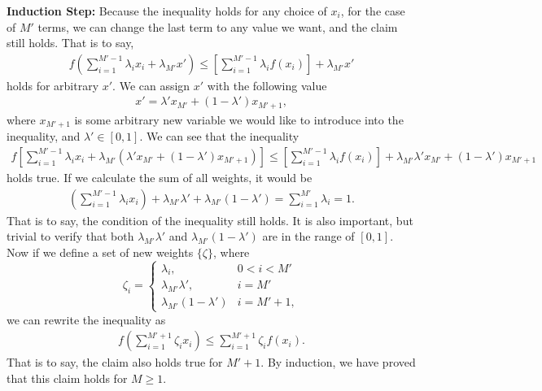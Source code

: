 \begin{answer}{}
	\noindent\textbf{Induction Step:}
	Because the inequality holds for any choice of $x_i$, for the case of $M'$ terms, we can change the last term to any value we want, and the claim still holds. That is to say,
	\begin{align}
		f\left( \sum_{i = 1}^{M' - 1} \lambda_i x_i  + \lambda_{M'}x'\right) \leq \left[\sum_{i = 1}^{M' - 1} \lambda_i f(x_i)\right] + \lambda_{M'}x'
	\end{align}
	holds for arbitrary $x'$. We can assign $x'$ with the following value
	\begin{align}
		x' = \lambda' x_{M'} + (1- \lambda') x_{M' + 1},
	\end{align}
	where $x_{M' + 1}$ is some arbitrary new variable we would like to introduce into the inequality, and $\lambda' \in [0, 1]$. We can see that the inequality
	\begin{align}
		f\left[ \sum_{i = 1}^{M' - 1} \lambda_i x_i  + \lambda_{M'}(\lambda' x_{M'} + (1- \lambda') x_{M' + 1}) \right] \leq \left[\sum_{i = 1}^{M' - 1} \lambda_i f(x_i)\right] + \lambda_{M'}\lambda' x_{M'} + (1- \lambda') x_{M' + 1}
	\end{align}
	holds true. If we calculate the sum of all weights, it would be
	\begin{align}
		\left(\sum_{i = 1}^{M' - 1} \lambda_i x_i\right) + \lambda_{M'}\lambda' + \lambda_{M'}(1- \lambda') = \sum_{i = 1}^{M'} \lambda_i = 1.
	\end{align}
	That is to say, the condition of the inequality still holds. It is also important, but trivial to verify that both $\lambda_{M'}\lambda'$ and $\lambda_{M'}(1- \lambda')$ are in the range of $[0, 1]$. Now if we define a set of new weights $\{ \zeta \}$, where
	\begin{equation}
		\zeta_i = 
		\begin{cases}
			\lambda_i, & 0 < i < M'\\
			\lambda_{M'}\lambda', & i = M'\\
			\lambda_{M'}(1- \lambda') & i = M' + 1,
		\end{cases}
	\end{equation}
	we can rewrite the inequality as
	\begin{align}
		f\left( \sum_{i = 1}^{M' + 1} \zeta_i x_i \right) \leq \sum_{i = 1}^{M' + 1} \zeta_i f(x_i).
	\end{align}
	That is to say, the claim also holds true for $M' + 1$. By induction, we have proved that this claim holds for $M \geq 1$.
\end{answer}